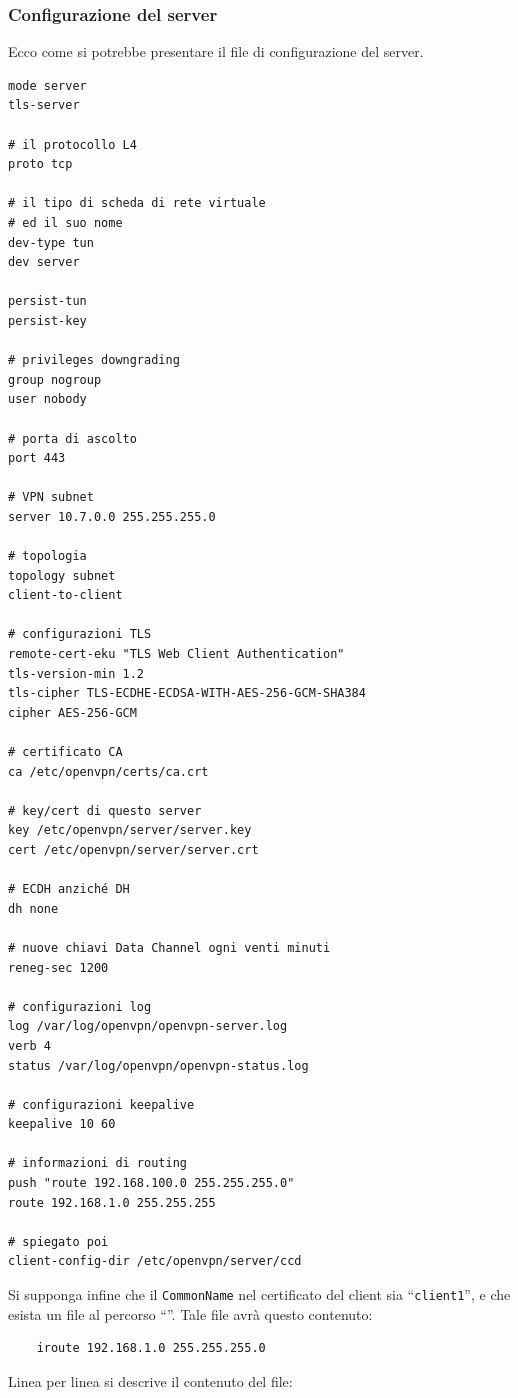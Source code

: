 \subsubsection{Configurazione del server}
Ecco come si potrebbe presentare
il file di configurazione del server.
\begin{verbatim}
mode server
tls-server
	
# il protocollo L4
proto tcp
	
# il tipo di scheda di rete virtuale
# ed il suo nome
dev-type tun
dev server
	
persist-tun
persist-key
	
# privileges downgrading
group nogroup
user nobody
	
# porta di ascolto
port 443
	
# VPN subnet
server 10.7.0.0 255.255.255.0
	
# topologia
topology subnet
client-to-client
	
# configurazioni TLS
remote-cert-eku "TLS Web Client Authentication"
tls-version-min 1.2
tls-cipher TLS-ECDHE-ECDSA-WITH-AES-256-GCM-SHA384
cipher AES-256-GCM
	
# certificato CA
ca /etc/openvpn/certs/ca.crt
	
# key/cert di questo server
key /etc/openvpn/server/server.key
cert /etc/openvpn/server/server.crt
	
# ECDH anziché DH
dh none
	
# nuove chiavi Data Channel ogni venti minuti
reneg-sec 1200
	
# configurazioni log
log /var/log/openvpn/openvpn-server.log
verb 4
status /var/log/openvpn/openvpn-status.log
	
# configurazioni keepalive
keepalive 10 60
	
# informazioni di routing
push "route 192.168.100.0 255.255.255.0"
route 192.168.1.0 255.255.255
	
# spiegato poi
client-config-dir /etc/openvpn/server/ccd
\end{verbatim}
Si supponga infine che il \texttt{CommonName} nel certificato del client sia
``\texttt{client1}'', e che esista un file al percorso
``''. Tale file avrà questo contenuto:
\begin{verbatim}
	iroute 192.168.1.0 255.255.255.0
\end{verbatim}
Linea per linea si descrive il contenuto del file:
